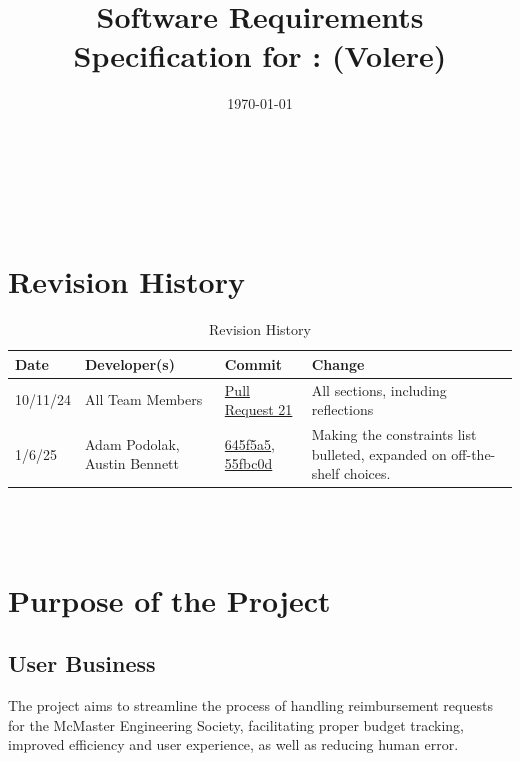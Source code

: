\documentclass[12pt]{article}
\begin{document}
\title{Software Requirements Specification for \progname: (Volere)} 
\author{\authname}
\date{\today}
	
\maketitle

~\newpage


\tableofcontents

~\newpage

\section*{Revision History}

\begin{table}[htp]
\centering
\caption{Revision History}
\label{TblRevisionHistory}
\begin{tabularx}{\textwidth}{l l l X}
\toprule
\textbf{Date} & \textbf{Developer(s)} & \textbf{Commit} & \textbf{Change}\\

\midrule
10/11/24 & 
All Team Members & 
\href{https://github.com/ausbennett/mes-finance-platform/pull/21}{Pull Request 21} & 
All sections, including reflections\\

\midrule
1/6/25 & 
  Adam Podolak, Austin Bennett & 
\href{https://github.com/ausbennett/mes-finance-platform/commit/645f5a5ecfee7cc2adbb784888d733d815d3080f}{645f5a5}, \href{https://github.com/ausbennett/mes-finance-platform/commit/55fbc0d26a10b56f90c50919de7a8c9ca920ec11}{55fbc0d}  & Making the constraints list bulleted, expanded on off-the-shelf choices. \\

\bottomrule
\end{tabularx}
\end{table}

~\\

~\newpage
\section{Purpose of the Project}
\subsection{User Business}
The project aims to streamline the process of handling reimbursement requests for the McMaster Engineering Society, facilitating proper budget tracking, improved efficiency and user experience, as well as reducing human error.
\end{document}
